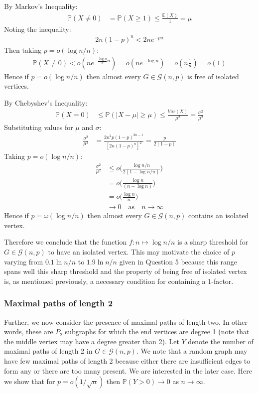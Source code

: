 \documentclass[a4paper]{article}
\begin{document}
\bigskip
By Markov's Inequality:
\begin{align*}
    \mathbb{P}(X\neq0) &= \mathbb{P}(X \geq 1) \leq \frac{\mathbb{E}(X)}{1} = \mu
\end{align*}
Noting the inequality:
\begin{align*}
    2n(1-p)^n < 2ne^{-pn}
\end{align*}
Then taking $p = o(\log{n}/n)$:
\begin{align*}
    \mathbb{P}(X\neq0) < o( ne^{-\frac{\log{n}}{n} n} ) = o( ne^{-\log{n}} ) = o( n\frac{1}{n} ) = o(1)
\end{align*}
Hence if $p=o(\log{n}/n)$ then almost every $G \in \mathcal{G}(n,p)$ is free of isolated vertices.

\bigskip
By Chebyshev's Inequality:
\begin{align*}
    \mathbb{P}(X=0) &\leq \mathbb{P}(|X-\mu| \geq \mu) \leq \frac{Var(X)}{\mu^2} = \frac{\sigma^2}{\mu^2}
\end{align*}
Substituting values for $\mu$ and $\sigma$:
\begin{align*}
    \frac{\sigma^2}{\mu^2} &= \frac{2n^2p(1-p)^{2n-1}}{[2n(1-p)^n]^2} = \frac{p}{2(1-p)}
\end{align*}
Taking $p = o(\log{n}/n)$:
\begin{align*}
    \frac{\sigma^2}{\mu^2} &\leq o\Bigg( \frac{\log{n}/n}{2(1-\log{n}/n)} \Bigg) \\
                           &= o\Bigg( \frac{\log{n}}{(n-\log{n})} \Bigg) \\
                           &= o\bigg( \frac{\log{n}}{n} \bigg) \\
                           &\rightarrow 0 \quad \text{as} \quad n \rightarrow \infty
\end{align*}
Hence if $p=\omega(\log{n}/n)$ then almost every $G \in \mathcal{G}(n,p)$ contains an isolated vertex.

\bigskip
Therefore we conclude that the function $f: n \mapsto \log{n}/n$ is a sharp threshold for $G \in \mathcal{G}(n,p)$ to have an isolated vertex. This may motivate the choice of $p$ varying from $0.1\ln{n}/n$ to $1.9\ln{n}/n$ given in Question 5 because this range spans well this sharp threshold and the property of being free of isolated vertex is, as mentioned previously, a necessary condition for containing a 1-factor.

\subsubsection*{Maximal paths of length 2}
Further, we now consider the presence of maximal paths of length two. In other words, these are $P_2$ subgraphs for which the end vertices are degree 1 (note that the middle vertex may have a degree greater than 2). Let $Y$ denote the number of maximal paths of length 2 in $G\in \mathcal{G}(n,p)$. We note that a random graph may have few maximal paths of length 2 because either there are insufficient edges to form any or there are too many present. We are interested in the later case. Here we show that for $p=o(1/\sqrt{n})$ then $\mathbb{P}(Y>0) \rightarrow 0$ as $n\rightarrow\infty$.
\end{document}
